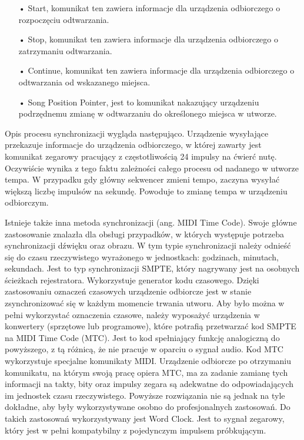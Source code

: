 \begin{itemize}
\item[•]{Start, komunikat ten zawiera informacje dla urządzenia odbiorczego o rozpoczęciu odtwarzania.}
\item[•]{Stop, komunikat ten zawiera informacje dla urządzenia odbiorczego o zatrzymaniu odtwarzania.}
\item[•]{Continue, komunikat ten zawiera informacje dla urządzenia odbiorczego o odtwarzania od wskazanego miejsca.}
\item[•]{Song Position Pointer, jest to komunikat nakazujący urządzeniu podrzędnemu zmianę w odtwarzaniu do określonego miejsca w utworze.}
\end{itemize}

Opis procesu synchronizacji wygląda następująco. Urządzenie wysyłające przekazuje informacje do urządzenia odbiorczego, w której zawarty jest komunikat zegarowy pracujący z częstotliwością 24 impulsy na ćwierć nutę. Oczywiście wynika z tego faktu zależności całego procesu od nadanego w utworze tempa. W przypadku gdy główny sekwencer zmieni tempo, zaczyna wysyłać większą liczbę impulsów na sekundę. Powoduje to zmianę tempa w urządzeniu odbiorczym.


Istnieje także inna metoda synchronizacji (ang. MIDI Time Code). Swoje główne zastosowanie znalazła dla obsługi przypadków, w których występuje potrzeba synchronizacji dźwięku oraz obrazu.  W tym typie synchronizacji należy odnieść się do czasu rzeczywistego wyrażonego w jednostkach: godzinach, minutach, sekundach. Jest to typ synchronizacji SMPTE, który nagrywany jest na osobnych ścieżkach rejestratora. Wykorzystuje generator kodu czasowego. Dzięki zastosowaniu oznaczeń czasowych urządzenie odbiorcze jest w stanie zsynchronizować się w każdym momencie trwania utworu. Aby było można w pełni wykorzystać oznaczenia czasowe, należy wyposażyć urządzenia w konwertery (sprzętowe lub programowe), które potrafią przetwarzać kod SMPTE na MIDI Time Code (MTC). Jest to kod spełniający funkcję analogiczną do powyższego, z tą różnicą, że nie pracuje w oparciu o sygnał audio. Kod MTC wykorzystuje specjalne komunikaty MIDI. Urządzenie odbiorcze po otrzymaniu komunikatu, na którym swoją pracę opiera MTC, ma za zadanie zamianę tych informacji na takty, bity oraz impulsy zegara są adekwatne do odpowiadających im jednostek czasu rzeczywistego. Powyższe rozwiązania nie są jednak na tyle dokładne, aby były wykorzystywane osobno do profesjonalnych zastosowań. Do takich zastosowań wykorzystywany jest Word Clock. Jest to sygnał zegarowy, który jest w pełni kompatybilny z pojedynczym impulsem próbkującym. 



